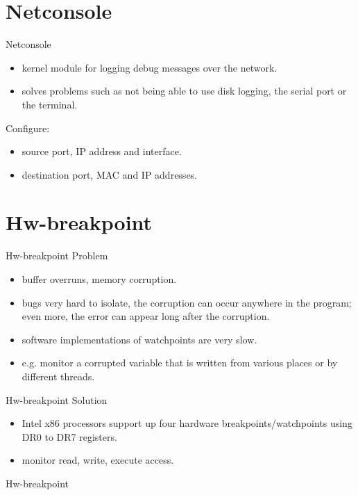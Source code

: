 \documentclass{workshop}
\begin{document}
\section{Netconsole}
\begin{frame}{Netconsole}
\begin{itemize}
\item kernel module for logging debug messages over the network.
\item solves problems such as not being able to use disk logging, the serial port or the
terminal.
\end{itemize}
Configure:\\
\begin{itemize}
\item source port, IP address and interface.
\item destination port, MAC and IP addresses.
\end{itemize}
\end{frame}

\section{Hw-breakpoint}
\begin{frame}{Hw-breakpoint}
Problem
\begin{itemize}
\item buffer overruns, memory corruption.
\item bugs very hard to isolate, the corruption can occur anywhere in the program;
even more, the error can appear long after the corruption.
\item software implementations of watchpoints are very slow.
\item e.g. monitor a corrupted variable that is written from various places or
by different threads.
\end{itemize}
\end{frame}

\begin{frame}{Hw-breakpoint}
Solution
\begin{itemize}
\item Intel x86 processors support up four hardware breakpoints/watchpoints
using DR0 to DR7 registers.
\item monitor read, write, execute access.
\end{itemize}
\end{frame}

\begin{frame}{Hw-breakpoint}

\end{frame}
\end{document}
